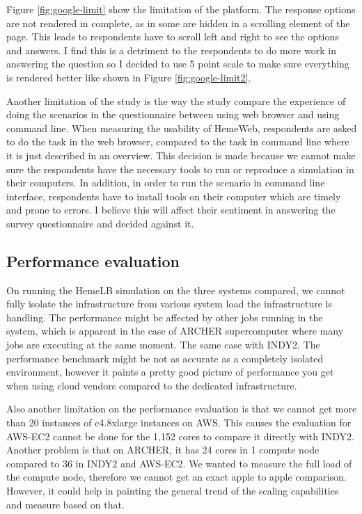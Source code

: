 \vspace{1cm}


Figure \ref{fig:google-limit} show the limitation of the platform. The response options are not rendered in complete, as in some are hidden in a scrolling element of the page. This leads to respondents have to scroll left and right to see the options and answers. I find this is a detriment to the respondents to do more work in answering the question so I decided to use 5 point scale to make sure everything is rendered better like shown in Figure \ref{fig:google-limit2}.


Another limitation of the study is the way the study compare the experience of doing the scenarios in the questionnaire between using web browser and using command line.  When measuring the usability of HemeWeb, respondents are asked to do the task in the web browser, compared to the task in command line where it is just described in an overview. This decision is made because we cannot make sure the respondents have the necessary tools to run or reproduce a simulation in their computers.  In addition, in order to run the scenario in command line interface, respondents have to install tools on their computer which are timely and prone to errors. I believe this will affect their sentiment in answering the survey questionnaire and decided against it.


\subsection{Performance evaluation}

On running the HemeLB simulation on the three systems compared, we cannot fully isolate the infrastructure from various system load the infrastructure is handling. The performance might be affected by other jobs running in the system, which is apparent in the case of ARCHER supercomputer where many jobs are executing at the same moment. The same case with INDY2. The performance benchmark might be not as accurate as a completely isolated environment, however it paints a pretty good picture of performance you get when using cloud vendors compared to the dedicated infrastructure. 

Also another limitation on the performance evaluation is that we cannot get more than 20 instances of c4.8xlarge instances on AWS. This causes the evaluation for AWS-EC2 cannot be done for the 1,152 cores to compare it directly with INDY2. Another problem is that on ARCHER, it has 24 cores in 1 compute node compared to 36 in INDY2 and AWS-EC2. We wanted to measure the full load of the compute node, therefore we cannot get an exact apple to apple comparison. However, it could help in painting the general trend of the scaling capabilities and measure based on that.
 
